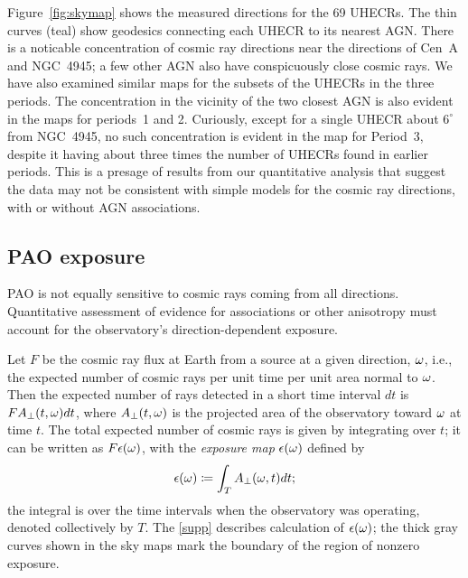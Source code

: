 Figure~\ref{fig:skymap} shows the measured directions for the 69 UHECRs.
The thin curves (teal) show
geodesics connecting each UHECR to its nearest AGN.
There is a noticable concentration of cosmic ray directions near the
directions of Cen~A and NGC~4945; a few other AGN also have conspicuously
close cosmic rays.  We have also examined similar maps for the subsets
of the UHECRs in the three periods.
The concentration in the vicinity of the two closest AGN
is also evident in the maps for periods~1 and 2.
Curiously, except for a single UHECR about $6^\circ$
from NGC~4945, no such concentration is evident in the map for Period~3,
despite it having about three times the number of UHECRs found in earlier
periods.  This is a presage of results from our quantitative analysis that
suggest the data may not be consistent with simple models for the cosmic ray
directions, with or without AGN associations.

\subsection{PAO exposure}

PAO is not equally sensitive to cosmic rays coming from all directions.
Quantitative assessment of evidence for associations or other anisotropy must
account for the observatory's direction-dependent exposure.

Let $F$ be the cosmic ray flux at Earth from a source at a given direction,
$\omega$, i.e., the expected number of cosmic rays per unit time per unit
area normal to $\omega$.   Then the expected number of rays detected in a
short time interval $dt$ is $F A_\perp(t,\omega) dt$, where $A_\perp(t,\omega)$ is
the projected area of the observatory toward $\omega$ at time $t$. The total
expected number of cosmic rays is given by integrating over $t$; it can be
written as $F\epsilon(\omega)$, with the {\em exposure map} $\epsilon(\omega)$
defined by
\begin{equation}
\expo(\tdrxn) \coloneqq \int_T  \Aperp(\tdrxn,t) dt;
\label{expo-def-main}
\end{equation}
the integral is over the time intervals when the observatory was operating,
denoted collectively by $T$.
The \ref{supp} \cite{S+12-UHECR-Supp} describes calculation of
$\epsilon(\omega)$; the thick gray curves shown in the sky maps mark the
boundary of the region of nonzero exposure.
